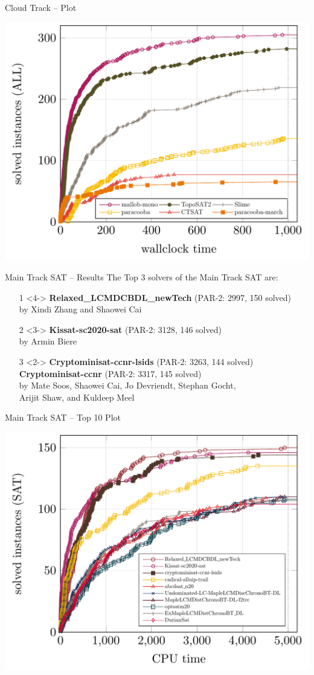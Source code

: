 \documentclass{beamer}
\begin{document}
\begin{frame}{Cloud Track -- Plot}

\centering
\includegraphics[width=.8\textwidth]{cloud-ALL}

\end{frame}


\begin{frame}{Main Track SAT -- Results}
The Top 3 solvers of the Main Track SAT are:
\begin{itemize}
\item[1]<4-> {\bf Relaxed\_LCMDCBDL\_newTech} (PAR-2: 2997, 150 solved)  \\
by Xindi Zhang and Shaowei Cai
\item[2]<3-> {\bf Kissat-sc2020-sat}  (PAR-2: 3128, 146 solved)\\
by Armin Biere
\item[3]<2-> {\bf Cryptominisat-ccnr-lsids} (PAR-2: 3263, 144 solved)\\
{\bf Cryptominisat-ccnr} (PAR-2: 3317, 145 solved)\\
by Mate Soos, Shaowei Cai, Jo Devriendt, Stephan Gocht,\\Arijit Shaw, and  Kuldeep Meel
\end{itemize}
\end{frame}

\begin{frame}{Main Track SAT -- Top 10 Plot}

\centering
\includegraphics[width=.8\textwidth]{main-top10-SAT}

\end{frame}
\end{document}
